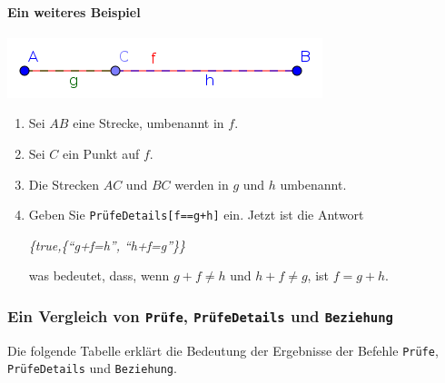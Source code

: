 \documentclass{article}
\begin{document}
\paragraph{Ein weiteres Beispiel}
\begin{center}
\includegraphics[scale=0.5]{ProveDetails-example-2}
\end{center}
\begin{enumerate}
    \item Sei $AB$ eine Strecke, umbenannt in $f$.
    \item Sei $C$ ein Punkt auf $f$.
    \item Die Strecken $AC$ und $BC$ werden in  $g$ und $h$ umbenannt.
    \item Geben Sie \texttt{PrüfeDetails[f==g+h]} ein. Jetzt ist die Antwort
    \begin{center}
        \textit{\{true,\{``g+f=h'', ``h+f=g''\}\}} 
    \end{center}
    was bedeutet, dass, wenn $g+f\neq h$ und $h+f\neq g$, ist $f=g+h$.
\end{enumerate}

\subsubsection{Ein Vergleich von \texttt{Prüfe}, \texttt{PrüfeDetails} und \texttt{Beziehung}}
\label{Erklaerungstabelle}

Die folgende Tabelle erklärt die Bedeutung der Ergebnisse der Befehle \texttt{Prüfe},
\texttt{PrüfeDetails} und \texttt{Beziehung}.
\end{document}
